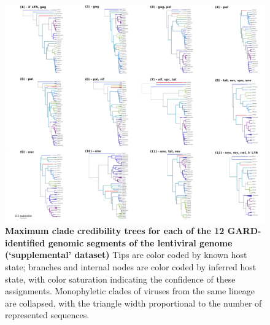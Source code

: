 \begin{figure}[ht!]
  \begin{centering}
    \includegraphics[width=\linewidth]{./png/siv_suppdata_trees.png}
  	\caption[Phylogenies of each segment of the lentiviral genome (`supplemental' dataset)]{\textbf{Maximum clade credibility trees for each of the 12 GARD-identified genomic segments of the lentiviral genome (`supplemental' dataset) }
    Tips are color coded by known host state; branches and internal nodes are color coded by inferred host state, with color saturation indicating the confidence of these assignments.
    Monophyletic clades of viruses from the same lineage are collapsed, with the triangle width proportional to the number of represented sequences.
        }
  	\label{siv_suppdata_trees}
  \end{centering}
\end{figure}

